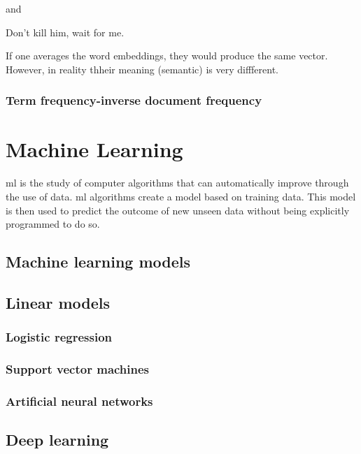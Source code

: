 and

Don't kill him, wait for me.

If one averages the word embeddings, they would  produce the same vector. However,  in reality thheir meaning  (semantic) is very  diffferent.

\subsubsection{Term frequency-inverse document frequency}
\label{sec:tf-idf}


\section{Machine Learning}
\label{sec:machine-learning}
\acrfull{ml} is the study of computer algorithms that can automatically improve through the use of data. \acrshort{ml} algorithms create a model based on training data. This model is then used to predict the outcome of new unseen data without being explicitly programmed to do so.

\subsection{Machine learning models}
\label{sec:machine-learning-models}

\subsection{Linear models}
\label{sec:linear-models}

\subsubsection{Logistic regression}
\label{sec:logistic-regression}

\subsubsection{Support vector machines}
\label{sec:support-vector-machines}

\subsubsection{Artificial neural networks}
\label{sec:artificial-neural-networks}

\subsection{Deep learning}
\label{sec:deep-learning}


